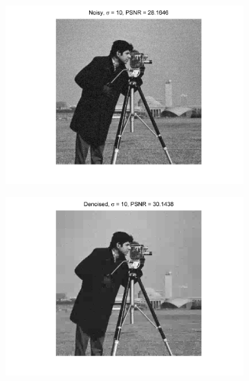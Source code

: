 \documentclass[11pt]{article}
\begin{document}
\begin{figure}[H]
	\centering
	\begin{subfigure}{0.4\textwidth}
	  	\centering
		\includegraphics[trim=0.5in 0.1in 0.5in 0in, width=\textwidth]{Fig_Camera_Noisy_Sigma_10.png}        
		\caption{}
	    \label{Fig_Camera_Noisy_Sigma_10}	    
    \end{subfigure}
	\begin{subfigure}{0.4\textwidth}
        \centering
		\includegraphics[trim=0.5in 0.1in 0.5in 0in, width=\textwidth]{Fig_Camera_Denoised_Sigma_10.png}
		\caption{}
		\label{Fig_Camera_Denoised_Sigma_10}
	\end{subfigure}
	

\end{figure}
\end{document}
